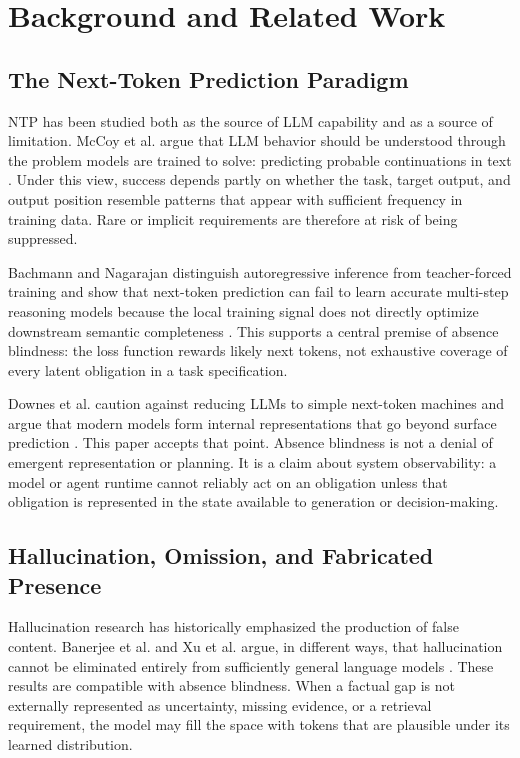 \documentclass[10pt,conference]{IEEEtran}
\begin{document}
\section{Background and Related Work}
\subsection{The Next-Token Prediction Paradigm}
NTP has been studied both as the source of LLM capability and as a source of limitation. McCoy et al. argue that LLM behavior should be understood through the problem models are trained to solve: predicting probable continuations in text \cite{mccoy2023embers}. Under this view, success depends partly on whether the task, target output, and output position resemble patterns that appear with sufficient frequency in training data. Rare or implicit requirements are therefore at risk of being suppressed.

Bachmann and Nagarajan distinguish autoregressive inference from teacher-forced training and show that next-token prediction can fail to learn accurate multi-step reasoning models because the local training signal does not directly optimize downstream semantic completeness \cite{bachmann2024pitfalls}. This supports a central premise of absence blindness: the loss function rewards likely next tokens, not exhaustive coverage of every latent obligation in a task specification.

Downes et al. caution against reducing LLMs to simple next-token machines and argue that modern models form internal representations that go beyond surface prediction \cite{downes2024notjust}. This paper accepts that point. Absence blindness is not a denial of emergent representation or planning. It is a claim about system observability: a model or agent runtime cannot reliably act on an obligation unless that obligation is represented in the state available to generation or decision-making.

\subsection{Hallucination, Omission, and Fabricated Presence}
Hallucination research has historically emphasized the production of false content. Banerjee et al. and Xu et al. argue, in different ways, that hallucination cannot be eliminated entirely from sufficiently general language models \cite{banerjee2024always,xu2025inevitable}. These results are compatible with absence blindness. When a factual gap is not externally represented as uncertainty, missing evidence, or a retrieval requirement, the model may fill the space with tokens that are plausible under its learned distribution.
\end{document}
